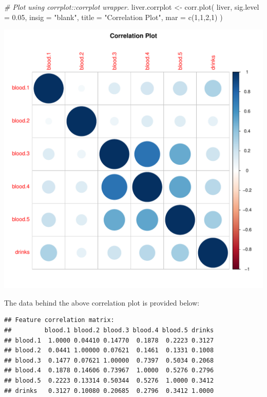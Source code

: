 \documentclass[
  11pt,
  a4paper,
]{scrartcl}
\newenvironment{Shaded}{\begin{snugshade}}{\end{snugshade}}
\newcommand{\AttributeTok}[1]{\textcolor[rgb]{0.77,0.63,0.00}{#1}}
\newcommand{\CommentTok}[1]{\textcolor[rgb]{0.56,0.35,0.01}{\textit{#1}}}
\newcommand{\DecValTok}[1]{\textcolor[rgb]{0.00,0.00,0.81}{#1}}
\newcommand{\FloatTok}[1]{\textcolor[rgb]{0.00,0.00,0.81}{#1}}
\newcommand{\FunctionTok}[1]{\textcolor[rgb]{0.00,0.00,0.00}{#1}}
\newcommand{\NormalTok}[1]{#1}
\newcommand{\OtherTok}[1]{\textcolor[rgb]{0.56,0.35,0.01}{#1}}
\newcommand{\StringTok}[1]{\textcolor[rgb]{0.31,0.60,0.02}{#1}}
\begin{document}
\begin{Shaded}
\begin{Highlighting}[]
\CommentTok{\# Plot using corrplot::corrplot wrapper.}
\NormalTok{liver.corrplot }\OtherTok{\textless{}{-}} \FunctionTok{corr.plot}\NormalTok{(}
\NormalTok{  liver, }\AttributeTok{sig.level =} \FloatTok{0.05}\NormalTok{, }\AttributeTok{insig =} \StringTok{"blank"}\NormalTok{,}
  \AttributeTok{title =} \StringTok{"Correlation Plot"}\NormalTok{,}
  \AttributeTok{mar =} \FunctionTok{c}\NormalTok{(}\DecValTok{1}\NormalTok{,}\DecValTok{1}\NormalTok{,}\DecValTok{2}\NormalTok{,}\DecValTok{1}\NormalTok{)}
\NormalTok{)}
\end{Highlighting}
\end{Shaded}

\begin{center}\includegraphics{figure/analysis-eda-corrplot-1} \end{center}

The data behind the above correlation plot is provided below:

\begin{verbatim}
## Feature correlation matrix: 
##         blood.1 blood.2 blood.3 blood.4 blood.5 drinks
## blood.1  1.0000 0.04410 0.14770  0.1878  0.2223 0.3127
## blood.2  0.0441 1.00000 0.07621  0.1461  0.1331 0.1008
## blood.3  0.1477 0.07621 1.00000  0.7397  0.5034 0.2068
## blood.4  0.1878 0.14606 0.73967  1.0000  0.5276 0.2796
## blood.5  0.2223 0.13314 0.50344  0.5276  1.0000 0.3412
## drinks   0.3127 0.10080 0.20685  0.2796  0.3412 1.0000
\end{verbatim}
\end{document}
